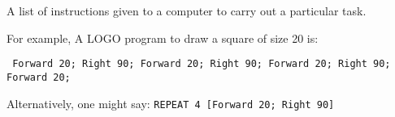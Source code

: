 A list of instructions given to a computer to carry out a particular task.

\par
For example, A LOGO program to draw a square of size 20 is:
\par

\texttt{
Forward 20; 
Right 90;   
Forward 20; 
Right 90;  
Forward 20;
Right 90;   
Forward 20;
}

Alternatively, one might say:
\texttt{REPEAT 4 [Forward 20; Right 90]}
  
  